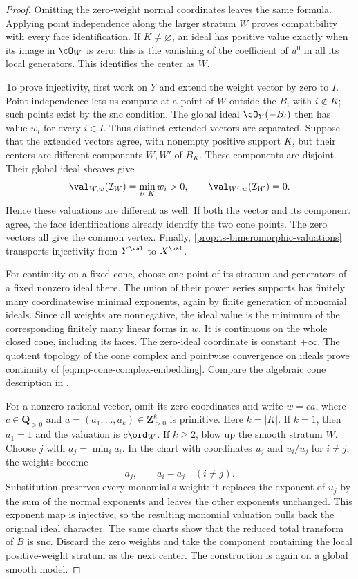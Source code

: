 \begin{proof}
Omitting the zero-weight normal coordinates leaves the same formula.
Applying point independence along the larger stratum $W$ proves
compatibility with every face identification. If $K\ne\varnothing$,
an ideal has positive value exactly when its image in $\cO_W$
is zero: this is the vanishing of the coefficient of $u^0$ in all
its local generators. This identifies the center as $W$.

To prove injectivity, first work on $Y$ and extend the weight vector
by zero to $I$. Point independence lets us compute at a point of
$W$ outside the $B_i$ with $i\notin K$; such points exist by the
snc condition. The global ideal $\cO_Y(-B_i)$ then has value $w_i$
for every $i\in I$. Thus distinct extended vectors are separated.
Suppose that the extended vectors agree, with nonempty positive
support $K$, but their centers are different components $W,W'$ of
$B_K$. These components are disjoint. Their global ideal sheaves
give
\[
     \val_{W,w}(\mathcal I_W)=\min_{i\in K}w_i>0,
     \qquad \val_{W',w}(\mathcal I_W)=0.
\]
Hence these valuations are different as well. If both the vector
and its component agree, the face identifications already identify
the two cone points. The zero vectors all give the common vertex.
Finally, \cref{prop:ts-bimeromorphic-valuations} transports
injectivity from $Y^{\val}$ to $X^{\val}$.

For continuity on a fixed cone, choose one point of its stratum and
generators of a fixed nonzero ideal there. The union of their power
series supports has finitely many coordinatewise minimal exponents,
again by finite generation of monomial ideals. Since all weights
are nonnegative, the ideal value is the minimum of the corresponding
finitely many linear forms in $w$. It is continuous on the whole
closed cone, including its faces. The zero-ideal coordinate is
constant $+\infty$. The quotient topology of the cone complex and
pointwise convergence on ideals prove continuity of
\eqref{eq:mp-cone-complex-embedding}. Compare the algebraic cone
description in \cite[Lemma~4.5 and the following paragraph]{JM12}.

For a nonzero rational vector, omit its zero coordinates and write
$w=ca$, where $c\in\mathbf Q_{>0}$ and
$a=(a_1,\ldots,a_k)\in\mathbf Z_{>0}^k$ is primitive.
Here $k=|K|$. If $k=1$, then $a_1=1$ and the valuation is
$c\ord_W$. If $k\geq2$, blow up the smooth stratum $W$.
Choose $j$ with $a_j=\min_i a_i$. In the chart with coordinates
$u_j$ and $u_i/u_j$ for $i\ne j$, the weights become
\[
                    a_j,\qquad a_i-a_j\quad(i\ne j).
\]
Substitution preserves every monomial's weight: it replaces
the exponent of $u_j$ by the sum of the normal exponents and
leaves the other exponents unchanged. This exponent map is
injective, so the resulting monomial valuation pulls back the
original ideal character. The same charts show that the reduced
total transform of $B$ is snc. Discard the zero weights and take
the component containing the local positive-weight stratum as
the next center. The construction is again on a global smooth model.


\end{proof}
